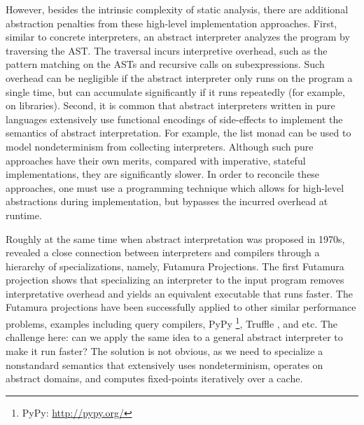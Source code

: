 However, besides the intrinsic complexity of static analysis, there are
additional abstraction penalties from these high-level implementation
approaches. First, similar to concrete interpreters, an abstract interpreter
analyzes the program by traversing the AST. The traversal incurs
interpretive overhead, such as the pattern matching on the ASTs and recursive
calls on subexpressions. Such overhead can be negligible if the abstract
interpreter only runs on the program a single time, but can accumulate
significantly if it runs repeatedly (for example, on libraries).  Second, it is
common that abstract interpreters written in pure languages extensively use
functional encodings of side-effects to implement the semantics of abstract interpretation.
For example, the list monad can be used to model nondeterminism from collecting
interpreters.
Although such pure approaches have their own merits, compared with imperative,
stateful implementations, they are significantly slower.  In order to
reconcile these approaches, one must use a programming technique which allows
for high-level abstractions during implementation, but bypasses the
incurred overhead at runtime.

Roughly at the same time when abstract interpretation was proposed in
1970s, \citet{futamura1971partial} revealed a close
connection between interpreters and compilers through a hierarchy of
specializations, namely, Futamura Projections. The first Futamura
projection shows that specializing an interpreter to the input program
removes interpretative overhead and yields an equivalent executable
that runs faster. The Futamura projections have been successfully applied to
other similar performance problems, examples including
query compilers\cite{DBLP:conf/sigmod/TahboubER18}, PyPy \footnote{PyPy:
\url{http://pypy.org/}}, Truffle \cite{Marr:2015:TVP:2814270.2814275}, and etc.
The challenge here: can we apply the same idea to a general abstract interpreter
to make it run faster? The solution is not obvious, as we need to specialize
a nonstandard semantics that extensively uses nondeterminism, operates on
abstract domains, and computes fixed-points iteratively over a cache. 

